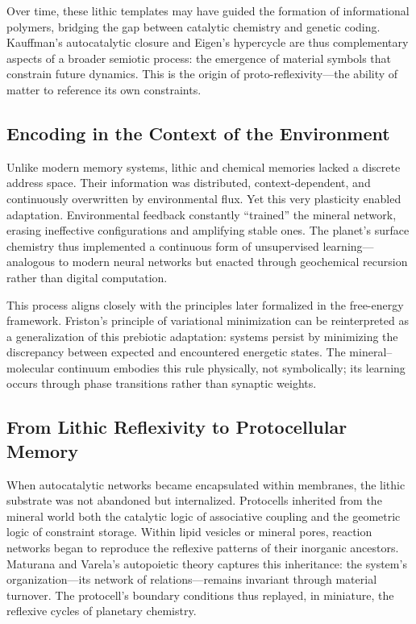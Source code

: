 \documentclass[11pt,a4paper]{article}
\begin{document}
Over time, these lithic templates may have guided the formation of informational polymers, bridging the gap between catalytic chemistry and genetic coding.  Kauffman’s autocatalytic closure and Eigen’s hypercycle are thus complementary aspects of a broader semiotic process: the emergence of material symbols that constrain future dynamics.  This is the origin of proto-reflexivity—the ability of matter to reference its own constraints.

\subsection{Encoding in the Context of the Environment}

Unlike modern memory systems, lithic and chemical memories lacked a discrete address space.  Their information was distributed, context-dependent, and continuously overwritten by environmental flux.  Yet this very plasticity enabled adaptation.  Environmental feedback constantly “trained” the mineral network, erasing ineffective configurations and amplifying stable ones.  The planet’s surface chemistry thus implemented a continuous form of unsupervised learning—analogous to modern neural networks but enacted through geochemical recursion rather than digital computation.

This process aligns closely with the principles later formalized in the free-energy framework.  Friston’s \citep{Friston2010FreeEnergyPrinciple} principle of variational minimization can be reinterpreted as a generalization of this prebiotic adaptation: systems persist by minimizing the discrepancy between expected and encountered energetic states.  The mineral–molecular continuum embodies this rule physically, not symbolically; its learning occurs through phase transitions rather than synaptic weights.

\subsection{From Lithic Reflexivity to Protocellular Memory}

When autocatalytic networks became encapsulated within membranes, the lithic substrate was not abandoned but internalized.  Protocells inherited from the mineral world both the catalytic logic of associative coupling and the geometric logic of constraint storage.  Within lipid vesicles or mineral pores, reaction networks began to reproduce the reflexive patterns of their inorganic ancestors.  Maturana and Varela’s autopoietic theory \citep{MaturanaVarela1980Autopoiesis} captures this inheritance: the system’s organization—its network of relations—remains invariant through material turnover.  The protocell’s boundary conditions thus replayed, in miniature, the reflexive cycles of planetary chemistry.
\end{document}
